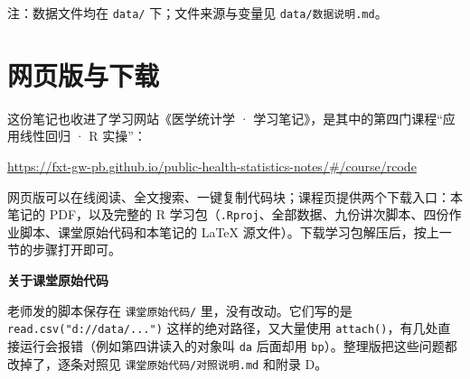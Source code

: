 \begin{studysource}
注：数据文件均在 \texttt{data/} 下；文件来源与变量见 \texttt{data/数据说明.md}。
\end{studysource}


\section{网页版与下载}
这份笔记也收进了学习网站《医学统计学 · 学习笔记》，是其中的第四门课程“应用线性回归 · R 实操”：


\url{https://fxt-gw-pb.github.io/public-health-statistics-notes/#/course/rcode}


网页版可以在线阅读、全文搜索、一键复制代码块；课程页提供两个下载入口：本笔记的 PDF，以及完整的 R 学习包（\Verb|.Rproj|、全部数据、九份讲次脚本、四份作业脚本、课堂原始代码和本笔记的 LaTeX 源文件）。下载学习包解压后，按上一节的步骤打开即可。


\begin{studyexplain}
\textbf{关于课堂原始代码}


老师发的脚本保存在 \Verb|课堂原始代码/| 里，没有改动。它们写的是 \Verb|read.csv("d://data/...")| 这样的绝对路径，又大量使用 \Verb|attach()|，有几处直接运行会报错（例如第四讲读入的对象叫 \Verb|da| 后面却用 \Verb|bp|）。整理版把这些问题都改掉了，逐条对照见 \Verb|课堂原始代码/对照说明.md| 和附录 D。

\end{studyexplain}
